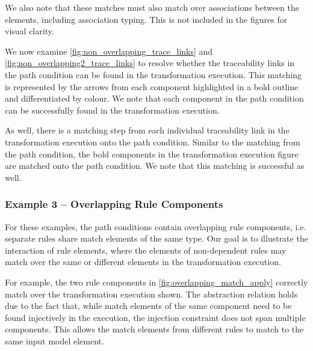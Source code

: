 We also note that these matches must also match over associations between the elements, including association typing. This is not included in the figures for visual clarity.


We now examine \cref{fig:non_overlapping_trace_links} and \cref{fig:non_overlapping2_trace_links} to resolve whether the traceability links in the path condition can be found in the transformation execution. This matching is represented by the arrows from each component highlighted in a bold outline and differentiated by colour. We note that each component in the path condition can be successfully found in the transformation execution.

As well, there is a matching step from each individual traceability link in the transformation execution onto the path condition. Similar to the matching from the path condition, the bold components in the transformation execution figure are matched onto the path condition. We note that this matching is successful as well.


\subsubsection{Example 3 -- Overlapping Rule Components}
\label{subsubsec:abstraction_relation_overlapping}

For these examples, the path conditions contain overlapping rule components, i.e. separate rules share match elements of the same type. Our goal is to illustrate the interaction of rule elements, where the elements of non-dependent rules may match over the same or different elements in the transformation execution.

For example, the two rule components in \cref{fig:overlapping_match_apply} correctly match over the transformation execution shown. The abstraction relation holds due to the fact that, while match elements of the same component need to be found injectively in the execution, the injection constraint does not span multiple components. This allows the match elements from different rules to match to the same input model element.


